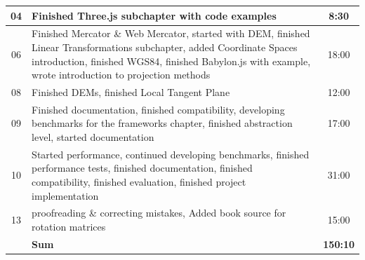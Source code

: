 \begin{table}[H]
\begin{tabularx}{\textwidth}{|c|X|c|}
        \hline %
        04            & Finished Three.js subchapter with code examples                                                                                                                                                                                   & 8:30            \\
        \hline %
        06            & Finished Mercator \& Web Mercator, started with DEM, finished Linear Transformations subchapter, added Coordinate Spaces introduction, finished WGS84, finished Babylon.js with example, wrote introduction to projection methods & 18:00           \\
        \hline %
        08            & Finished DEMs, finished Local Tangent Plane                                                                                                                                                                                       & 12:00           \\
        \hline %
        09            & Finished documentation, finished compatibility, developing benchmarks for the frameworks chapter, finished abstraction level, started documentation                                                                               & 17:00           \\
        \hline %
        10            & Started performance, continued developing benchmarks, finished performance tests, finished documentation, finished compatibility, finished evaluation, finished project implementation                                            & 31:00           \\
        \hline %
        13            & proofreading \& correcting mistakes, Added book source for rotation matrices                                                                                                                                                      & 15:00           \\
        \hline %
                      & \textbf{Sum}                                                                                                                                                                                                                      & \textbf{150:10} \\
        \hline %
    \end{tabularx}
\end{table}